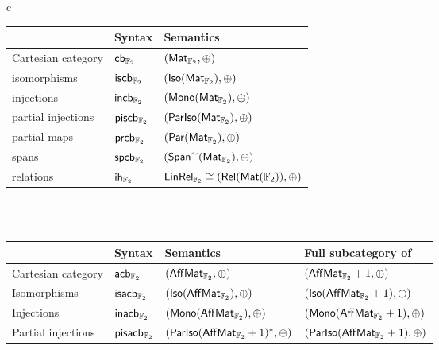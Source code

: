 \documentclass[12pt]{ociamthesis}  %
\begin{document}
\begin{landscape}
\begin{figure}
\centering
\begin{tabular}{c}
\begin{tabular}{|lll|}
\hline\hline
				& Syntax 									& Semantics\\
\hline
Cartesian category	& \hyperref[ex:bialg]{${\sf cb}_{\mathbb{F}_2}$}				& \hyperref[def:mat]{$(\mathsf{Mat}_{\mathbb{F}_2},\oplus)$}\\
isomorphisms		& \hyperref[def:sfiso]{${\sf is}{\sf cb}_{\mathbb{F}_2}$}			& \hyperref[lem:sfiso]{$({\sf Iso}(\mathsf{Mat}_{\mathbb{F}_2}),\oplus)$}\\		
injections	     		& \hyperref[def:injcb]{${\sf in}{\sf cb}_{\mathbb{F}_2}$}			& \hyperref[lem:injcb]{$({\sf Mono}(\mathsf{Mat}_{\mathbb{F}_2}),\oplus)$}\\
partial injections	& \hyperref[def:pariso:cb]{${\sf pis}{\sf cb}_{\mathbb{F}_2}$}	& \hyperref[lem:parisocb]{$(\mathsf{Par}{\sf Iso}(\mathsf{Mat}_{\mathbb{F}_2}),\oplus)$}\\
partial maps      	& \hyperref[def:par:cb]{${\sf pr}{\sf cb}_{\mathbb{F}_2}$}		& \hyperref[lem:parcb]{$(\mathsf{Par}(\mathsf{Mat}_{\mathbb{F}_2}),\oplus)$}\\
spans                 	& \hyperref[def:spancb]{${\sf sp}{\sf cb}_{\mathbb{F}_2}$}		& \hyperref[lem:spancb]{$(\mathsf{Span}^\sim(\mathsf{Mat}_{\mathbb{F}_2}), \oplus)$}	\\
relations             	& \hyperref[def:ih]{${\sf ih}_{\mathbb{F}_2}$}				& \hyperref[lem:ih]{$\sf LinRel_{\mathbb{F}_2}\cong(\mathsf{Rel}(\mathsf{Mat}(\mathbb{F}_2)),\oplus)$}\\
\hline\hline
\end{tabular}\\
\\
\begin{tabular}{|llll|}
\hline\hline
				& Syntax 									& Semantics													& Full subcategory of\\
\hline
Cartesian category	& \hyperref[ex:affmat]{${\sf acb}_{\mathbb{F}_2}$}			& \hyperref[def:affmat]{$(\mathsf{Aff}\mathsf{Mat}_{\mathbb{F}_2},\oplus)$}						&		$(\mathsf{Aff}\mathsf{Mat}_{\mathbb{F}_2}+1,\oplus)$\\
Isomorphisms		& \hyperref[def:isoacb]{${\sf is}{\sf acb}_{\mathbb{F}_2}$}		& \hyperref[lem:isoacb]{$({\sf Iso}(\mathsf{Aff}\mathsf{Mat}_{\mathbb{F}_2}),\oplus)$}					&		$({\sf Iso}(\mathsf{Aff}\mathsf{Mat}_{\mathbb{F}_2}+1),\oplus)$\\
Injections	     		& \hyperref[def:injacb]{${\sf in}{\sf acb}_{\mathbb{F}_2}$}		& \hyperref[lem:injaffcb]{$({\sf Mono}(\mathsf{Aff}\mathsf{Mat}_{\mathbb{F}_2}),\oplus)$}				&		$({\sf Mono}(\mathsf{Aff}\mathsf{Mat}_{\mathbb{F}_2}+1),\oplus)$\\
Partial injections	& \hyperref[def:parisoaffcb]{${\sf pis}{\sf acb}_{\mathbb{F}_2}$}	& \hyperref[lem:parisoaffcb]{$(\mathsf{Par}{\sf Iso}(\mathsf{Aff}\mathsf{Mat}_{\mathbb{F}_2}+1)^*, \oplus)$}		&		$(\mathsf{Par}{\sf Iso}(\mathsf{Aff}\mathsf{Mat}_{\mathbb{F}_2}+1),\oplus)$\\

\end{tabular}
\end{tabular}
\end{figure}
\end{landscape}
\end{document}
